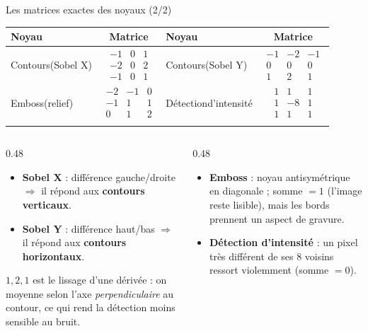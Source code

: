 \begin{frame}{Les matrices exactes des noyaux (2/2)}
\begin{center}
{\scriptsize
\setlength{\arraycolsep}{4pt}
\begin{tabular}{@{}l c l c@{}}
\toprule
\textbf{Noyau} & \textbf{Matrice} & \textbf{Noyau} & \textbf{Matrice} \\
\midrule
\addlinespace
Contours\newline (Sobel X) &
$\begin{smallmatrix}-1&0&1\\-2&0&2\\-1&0&1\end{smallmatrix}$ &
Contours\newline (Sobel Y) &
$\begin{smallmatrix}-1&-2&-1\\0&0&0\\1&2&1\end{smallmatrix}$ \\
\addlinespace
Emboss\newline (relief) &
$\begin{smallmatrix}-2&-1&0\\-1&1&1\\0&1&2\end{smallmatrix}$ &
Détection\newline d'intensité &
$\begin{smallmatrix}1&1&1\\1&-8&1\\1&1&1\end{smallmatrix}$ \\
\addlinespace
\bottomrule
\end{tabular}
}
\end{center}
\vspace{1mm}
\begin{columns}[t]
\begin{column}{0.48\textwidth}
\begin{itemize}
  \item \textbf{Sobel X} : différence gauche/droite $\Rightarrow$ il répond
  aux \textbf{contours verticaux}.
  \item \textbf{Sobel Y} : différence haut/bas $\Rightarrow$ il répond aux
  \textbf{contours horizontaux}.
\end{itemize}
\begin{ebox}
$1,2,1$ est le lissage d'une dérivée : on moyenne selon l'axe
\emph{perpendiculaire} au contour, ce qui rend la détection moins sensible au bruit.
\end{ebox}
\end{column}
\begin{column}{0.48\textwidth}
\begin{itemize}
  \item \textbf{Emboss} : noyau antisymétrique en diagonale ; somme $= 1$
  (l'image reste lisible), mais les bords prennent un aspect de gravure.
  \item \textbf{Détection d'intensité} : un pixel très différent de ses
  $8$ voisins ressort violemment (somme $= 0$).
\end{itemize}


\end{column}
\end{columns}
\end{frame}
